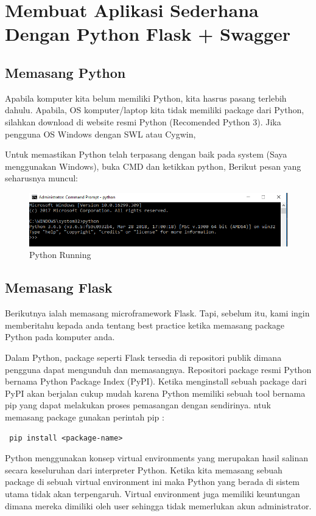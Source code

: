 \documentclass[12pt]{article}
\begin{document}
\section{Membuat Aplikasi Sederhana Dengan Python Flask + Swagger}

\subsection{Memasang Python}
Apabila komputer kita belum memiliki Python, kita hasrus pasang terlebih dahulu. Apabila, OS komputer/laptop kita tidak memiliki package dari Python, silahkan download di website resmi Python (Recomended Python 3). Jika pengguna OS Windows dengan SWL atau Cygwin,

Untuk memastikan Python telah terpasang dengan baik pada system (Saya menggunakan Windows), buka CMD dan ketikkan python,  Berikut pesan yang seharusnya muncul:

\begin{figure}[ht]
\centerline{\includegraphics[width=1\textwidth]{5Python.PNG}}
\caption{Python Running}
\label{gambar}
\end{figure}

\subsection{Memasang Flask}
Berikutnya ialah memasang microframework Flask. Tapi, sebelum itu, kami ingin memberitahu kepada anda tentang best practice ketika memasang package Python pada komputer anda.

Dalam Python, package seperti Flask tersedia di repositori publik dimana pengguna dapat mengunduh dan memasangnya. Repositori package resmi Python bernama Python Package Index (PyPI). Ketika menginstall sebuah package dari PyPI akan berjalan cukup mudah karena Python memiliki sebuah tool bernama pip yang dapat melakukan proses pemasangan dengan sendirinya. ntuk memasang package gunakan perintah pip :

\begin{verbatim}
 pip install <package-name>
\end{verbatim}

Python menggunakan konsep virtual environments yang merupakan hasil salinan secara keseluruhan dari interpreter Python. Ketika kita memasang sebuah package di sebuah virtual environment ini maka Python yang berada di sistem utama tidak akan terpengaruh. Virtual environment juga memiliki keuntungan dimana mereka dimiliki oleh user sehingga tidak memerlukan akun administrator.
\end{document}
